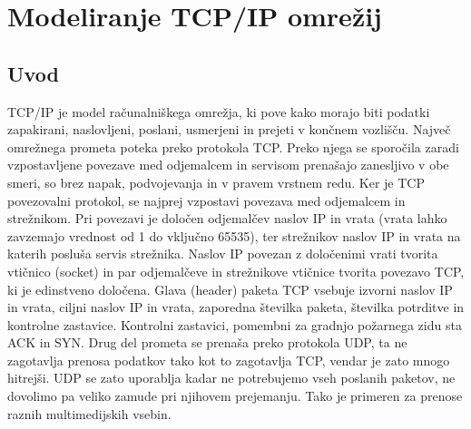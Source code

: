 \documentclass[11pt, a4paper, slovene]{book}
\begin{document}
\chapter{Modeliranje TCP/IP omrežij}
\section{Uvod}

TCP/IP je model računalniškega omrežja, ki pove kako morajo biti podatki
zapakirani, naslovljeni, poslani, usmerjeni in prejeti v končnem vozlišču.
Največ omrežnega prometa poteka preko protokola TCP. Preko njega se sporočila zaradi vzpostavljene povezave med odjemalcem in servisom prenašajo zanesljivo v obe smeri, so brez napak, podvojevanja in v pravem vrstnem redu. Ker je TCP povezovalni protokol, se najprej vzpostavi povezava med odjemalcem in strežnikom. Pri povezavi je določen odjemalčev naslov IP in vrata (vrata lahko zavzemajo vrednost od 1 do vključno 65535), ter strežnikov naslov IP in vrata na katerih posluša servis strežnika. Naslov IP povezan z določenimi vrati tvorita vtičnico (socket) in par odjemalčeve in strežnikove vtičnice tvorita povezavo TCP, ki je edinstveno določena. Glava (header) paketa TCP vsebuje izvorni naslov IP in vrata, ciljni naslov IP in vrata, zaporedna številka paketa, številka potrditve in kontrolne zastavice. Kontrolni zastavici, pomembni za gradnjo požarnega zidu sta ACK in SYN. Drug del prometa se prenaša preko protokola UDP, ta ne zagotavlja prenosa podatkov tako kot to zagotavlja TCP, vendar je zato mnogo hitrejši. UDP se zato uporablja kadar ne potrebujemo vseh poslanih paketov, ne dovolimo pa veliko zamude pri njihovem prejemanju. Tako je primeren za prenose raznih multimedijskih vsebin.
\end{document}
